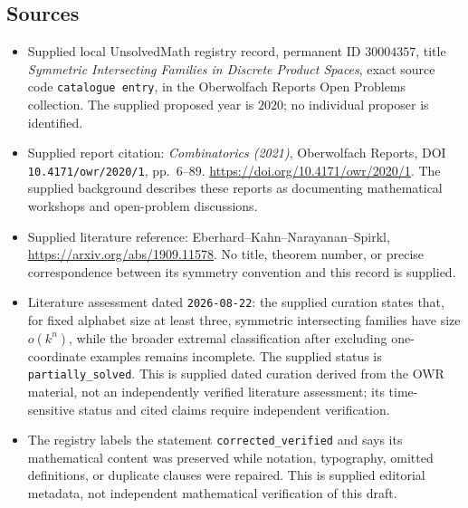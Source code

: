 \documentclass[11pt]{article}
\begin{document}
\subsection{Sources}
\begin{itemize}
\item Supplied local UnsolvedMath registry record, permanent ID \(30004357\), title \emph{Symmetric Intersecting Families in Discrete Product Spaces}, exact source code \texttt{catalogue entry}, in the Oberwolfach Reports Open Problems collection. The supplied proposed year is \(2020\); no individual proposer is identified.
\item Supplied report citation: \emph{Combinatorics (2021)}, Oberwolfach Reports, DOI \texttt{10.4171/owr/2020/1}, pp.\ 6--89. \url{https://doi.org/10.4171/owr/2020/1}. The supplied background describes these reports as documenting mathematical workshops and open-problem discussions.
\item Supplied literature reference: Eberhard--Kahn--Narayanan--Spirkl, \url{https://arxiv.org/abs/1909.11578}. No title, theorem number, or precise correspondence between its symmetry convention and this record is supplied.
\item Literature assessment dated \texttt{2026-08-22}: the supplied curation states that, for fixed alphabet size at least three, symmetric intersecting families have size \(o(k^n)\), while the broader extremal classification after excluding one-coordinate examples remains incomplete. The supplied status is \texttt{partially\_solved}. This is supplied dated curation derived from the OWR material, not an independently verified literature assessment; its time-sensitive status and cited claims require independent verification.
\item The registry labels the statement \texttt{corrected\_verified} and says its mathematical content was preserved while notation, typography, omitted definitions, or duplicate clauses were repaired. This is supplied editorial metadata, not independent mathematical verification of this draft.
\end{itemize}
\end{document}
